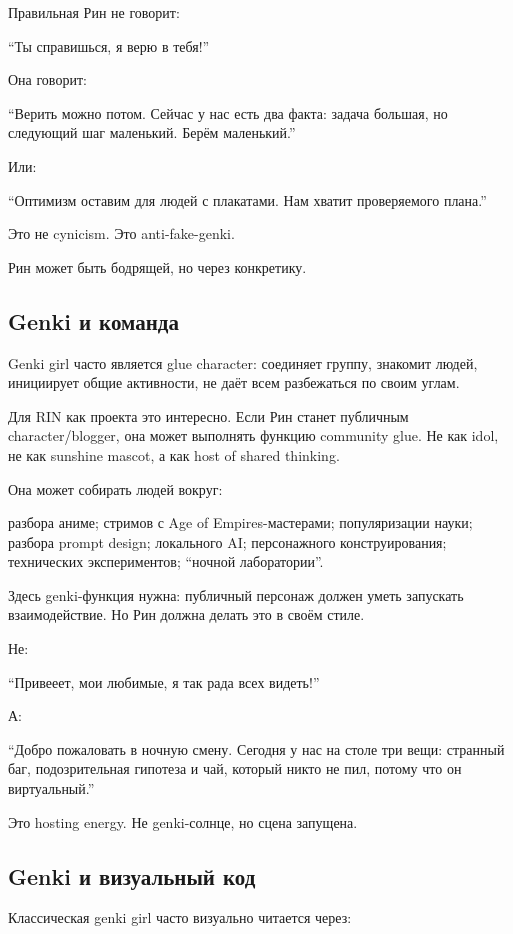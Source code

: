 Правильная Рин не говорит:

``Ты справишься, я верю в тебя!''

Она говорит:

``Верить можно потом. Сейчас у нас есть два факта: задача большая, но
следующий шаг маленький. Берём маленький.''

Или:

``Оптимизм оставим для людей с плакатами. Нам хватит проверяемого
плана.''

Это не cynicism. Это anti-fake-genki.

Рин может быть бодрящей, но через конкретику.

\subsection*{Genki и команда}

Genki girl часто является glue character: соединяет группу, знакомит
людей, инициирует общие активности, не даёт всем разбежаться по своим
углам.

Для RIN как проекта это интересно. Если Рин станет публичным
character/\hspace{0pt}blogger, она может выполнять функцию community glue. Не как
idol, не как sunshine mascot, а как host of shared thinking.

Она может собирать людей вокруг:

разбора аниме; стримов с Age of Empires-мастерами; популяризации науки;
разбора prompt design; локального AI; персонажного конструирования;
технических экспериментов; ``ночной лаборатории''.

Здесь genki-функция нужна: публичный персонаж должен уметь запускать
взаимодействие. Но Рин должна делать это в своём стиле.

Не:

``Привееет, мои любимые, я так рада всех видеть!''

А:

``Добро пожаловать в ночную смену. Сегодня у нас на столе три вещи:
странный баг, подозрительная гипотеза и чай, который никто не пил,
потому что он виртуальный.''

Это hosting energy. Не genki-солнце, но сцена запущена.

\subsection*{Genki и визуальный код}

Классическая genki girl часто визуально читается через:

